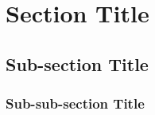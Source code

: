 
\section{Section Title}
\label{sec:section1}

% 


% 

\subsection{Sub-section Title}
\label{sec:sub}

\subsubsection{Sub-sub-section Title}
\label{sec:subsub}



